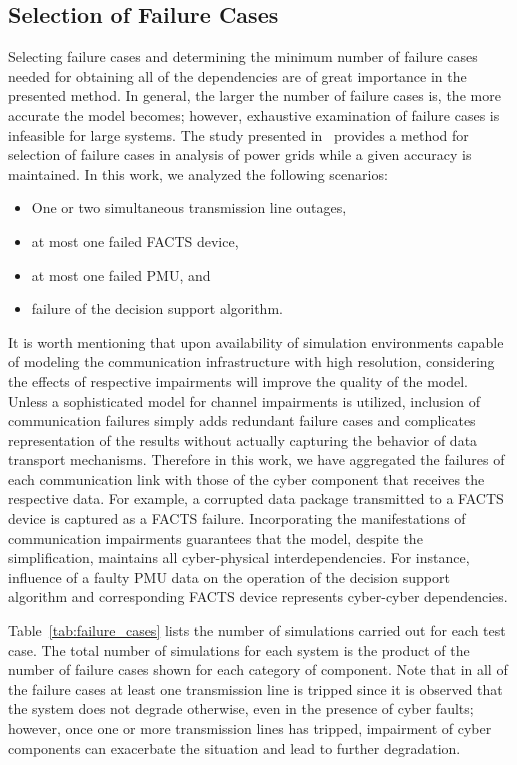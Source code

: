 \documentclass[12pt]{elsarticle}
\begin{document}
\subsection{Selection of Failure Cases}
\label{sec:case_study:selection}
Selecting failure cases and determining the minimum number of failure cases needed for obtaining all of the dependencies are of great importance in the presented method. In general, the larger the number of failure cases is, the more accurate the model becomes; however, exhaustive examination of failure cases is infeasible for large systems. The study presented in~\cite{QiS15} provides a method for selection of failure cases in analysis of power grids while a given accuracy is maintained. In this work, we analyzed the following scenarios:

\begin{itemize}
  \item One or two simultaneous transmission line outages,
  \item at most one failed FACTS device,
  \item at most one failed PMU, and
  \item failure of the decision support algorithm.
\end{itemize}

It is worth mentioning that upon availability of simulation environments capable of modeling the communication infrastructure with high resolution, considering the effects of respective impairments will improve the quality of the model. Unless a sophisticated model for channel impairments is utilized, inclusion of communication failures simply adds redundant failure cases and complicates representation of the results without actually capturing the behavior of data transport mechanisms. Therefore in this work, we have aggregated the failures of each communication link with those of the cyber component that receives the respective data. For example, a corrupted data package transmitted to a FACTS device is captured as a FACTS failure. Incorporating the manifestations of communication impairments guarantees that the model, despite the simplification, maintains all cyber-physical interdependencies. For instance, influence of a faulty PMU data on the operation of the decision support algorithm and corresponding FACTS device represents cyber-cyber dependencies.

Table~\ref{tab:failure_cases} lists the number of simulations carried out for each test case. The total number of simulations for each system is the product of the number of failure cases shown for each category of component. Note that in all of the failure cases at least one transmission line is tripped since it is observed that the system does not degrade otherwise, even in the presence of cyber faults; however, once one or more transmission lines has tripped, impairment of cyber components can exacerbate the situation and lead to further degradation.
\end{document}
